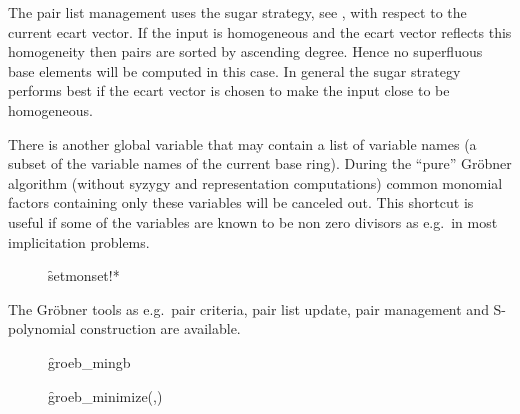 The pair list management uses the sugar strategy, see \cite{Giovini:91},
with respect to the current ecart vector. If the input is homogeneous
and the ecart vector reflects this homogeneity then pairs are sorted
by ascending degree. Hence no superfluous base
elements will be computed in this case. In general the sugar strategy
performs best if the ecart vector is chosen to make the input close
to be homogeneous.

There is another global variable
 that may contain
a list of variable names (a subset of the variable names of the
current base ring). During the ``pure'' Gr\"obner algorithm (without syzygy
and representation computations) common monomial factors containing
only these variables will be canceled out. This shortcut is useful if
some of the variables are known to be non zero divisors as e.g.\ in
most implicitation problems.
\begin{description}

\item[]
  \begin{syntax}
    \f{setmonset!*} 
  \end{syntax}
  \hypertarget{procedure:SETMONSET!*}{}
\end{description}

The Gr\"obner tools as e.g.\ pair criteria, pair list update, pair
management and S-polynomial construction are available.
\begin{description}

\item[]
  \begin{syntax}
    \f{groeb\_mingb} 
  \end{syntax}
  \hypertarget{procedure:GROEB_MINGB}{}

\item[]
  \begin{syntax}
    \f{groeb\_minimize}(,)
  \end{syntax}
  \hypertarget{procedure:GROEB_MINIMIZE}{}
\end{description}

